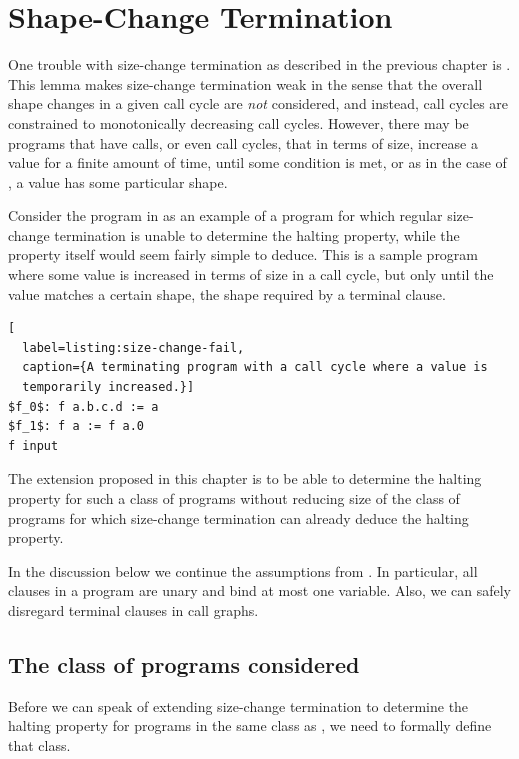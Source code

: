 \chapter{Shape-Change Termination}

One trouble with size-change termination as described in the previous chapter
is . This lemma makes size-change termination weak
in the sense that the overall shape changes in a given call cycle are
\emph{not} considered, and instead, call cycles are constrained to
monotonically decreasing call cycles.  However, there may be programs that have
calls, or even call cycles, that in terms of size, increase a value for a
finite amount of time, until some condition is met, or as in the case of \D{},
a value has some particular shape.

Consider the program in  as an example of a
program for which regular size-change termination is unable to determine the
halting property, while the property itself would seem fairly simple to deduce.
This is a sample program where some value is increased in terms of size in a
call cycle, but only until the value matches a certain shape, the shape
required by a terminal clause.

\begin{lstlisting}[
  label=listing:size-change-fail,
  caption={A terminating program with a call cycle where a value is
  temporarily increased.}]
$f_0$: f a.b.c.d := a
$f_1$: f a := f a.0
f input
\end{lstlisting}

The extension proposed in this chapter is to be able to determine the halting
property for such a class of programs without reducing size of the class of
programs for which size-change termination can already deduce the halting
property.

In the discussion below we continue the assumptions from
. In particular, all clauses in a
program are unary and bind at most one variable. Also, we can safely disregard
terminal clauses in call graphs.

\section{The class of programs considered}

Before we can speak of extending size-change termination to determine the
halting property for programs in the same class as
, we need to formally define that class.

